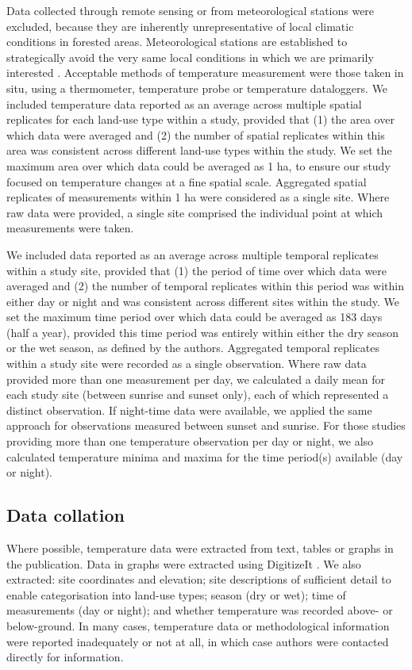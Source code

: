 \documentclass[12pt,a4paper,]{report}
\theoremstyle{definition}
\theoremstyle{definition}
\theoremstyle{definition}
\theoremstyle{remark}
\begin{document}
Data collected through remote sensing or from meteorological stations
were excluded, because they are inherently unrepresentative of local
climatic conditions in forested areas. Meteorological stations are
established to strategically avoid the very same local conditions in
which we are primarily interested \citep{frenne_weather2016}. Acceptable
methods of temperature measurement were those taken in situ, using a
thermometer, temperature probe or temperature dataloggers. We included
temperature data reported as an average across multiple spatial
replicates for each land-use type within a study, provided that (1) the
area over which data were averaged and (2) the number of spatial
replicates within this area was consistent across different land-use
types within the study. We set the maximum area over which data could be
averaged as 1 ha, to ensure our study focused on temperature changes at
a fine spatial scale. Aggregated spatial replicates of measurements
within 1 ha were considered as a single site. Where raw data were
provided, a single site comprised the individual point at which
measurements were taken.

We included data reported as an average across multiple temporal
replicates within a study site, provided that (1) the period of time
over which data were averaged and (2) the number of temporal replicates
within this period was within either day or night and was consistent
across different sites within the study. We set the maximum time period
over which data could be averaged as 183 days (half a year), provided
this time period was entirely within either the dry season or the wet
season, as defined by the authors. Aggregated temporal replicates within
a study site were recorded as a single observation. Where raw data
provided more than one measurement per day, we calculated a daily mean
for each study site (between sunrise and sunset only), each of which
represented a distinct observation. If night-time data were available,
we applied the same approach for observations measured between sunset
and sunrise. For those studies providing more than one temperature
observation per day or night, we also calculated temperature minima and
maxima for the time period(s) available (day or night).

\subsection{Data collation}\label{data-collation}

Where possible, temperature data were extracted from text, tables or
graphs in the publication. Data in graphs were extracted using
DigitizeIt \citep[www.digitizeit.de;][]{scheffers_microhabitats2014}. We
also extracted: site coordinates and elevation; site descriptions of
sufficient detail to enable categorisation into land-use types; season
(dry or wet); time of measurements (day or night); and whether
temperature was recorded above- or below-ground. In many cases,
temperature data or methodological information were reported
inadequately or not at all, in which case authors were contacted
directly for information.
\end{document}
